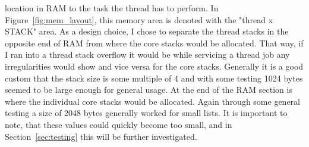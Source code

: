 location in RAM to the task the thread has to perform. In
Figure~\ref{fig:mem_layout}, this memory area is denoted with the "thread x
STACK" area. As a design choice, I chose to separate the thread stacks in the
opposite end of RAM from where the core stacks would be allocated. That way, if
I ran into a thread stack overflow it would be while servicing a thread job any
irregularities would show and vice versa for the core stacks. Generally it is a
good custom that the stack size is some multiple of 4 and with some testing 1024
bytes seemed to be large enough for general usage. At the end of the RAM section
is where the individual core stacks would be allocated. Again through some
general testing a size of 2048 bytes generally worked for small lists. It is
important to note, that these values could quickly become too small, and in
Section~\ref{sec:testing} this will be further investigated.

